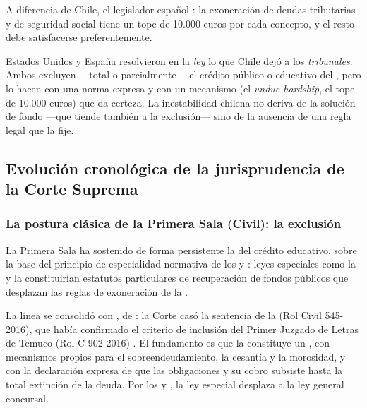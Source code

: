 A diferencia de Chile, el legislador español : la exoneración de deudas tributarias y de seguridad social tiene un tope de
10.000 euros por cada concepto, y el resto debe satisfacerse preferentemente.

\begin{foco}
Estados Unidos y España resolvieron en la \emph{ley} lo que Chile dejó a los \emph{tribunales}.
Ambos excluyen ---total o parcialmente--- el crédito público o educativo del \discharge{}, pero
lo hacen con una norma expresa y con un mecanismo (el \emph{undue hardship}, el tope de
10.000 euros) que da certeza. La inestabilidad chilena no deriva de la solución de fondo
---que tiende también a la exclusión--- sino de la ausencia de una regla legal que la fije.
\end{foco}

\subsection{Evolución cronológica de la jurisprudencia de la Corte Suprema}

\subsubsection{La postura clásica de la Primera Sala (Civil): la exclusión}

La Primera Sala ha sostenido de forma persistente la  del crédito educativo,
sobre la base del principio de especialidad normativa de los  y : leyes
especiales como la \Lcae{} \citeyearpar{ley-20027} y la \Lfondosolidario{}
\citeyearpar{ley-19287} constituirían estatutos particulares de recuperación de fondos públicos
que desplazan las reglas de exoneración de la \LIR{}.

La línea se consolidó con , de  \parencite{juris-jamarne-salazar}: la Corte casó la sentencia de la  (Rol Civil
545-2016), que había confirmado el criterio de inclusión del Primer Juzgado de Letras de Temuco
(Rol C-902-2016) \parencite{juris-jamarne-primera-instancia}. El fundamento es que la \Lcae{}
constituye un , con mecanismos
propios para el sobreendeudamiento, la cesantía y la morosidad, y con la declaración expresa de
que las obligaciones  y su cobro subsiste hasta la total extinción de la
deuda. Por los  y , la ley especial desplaza a la ley general concursal.

